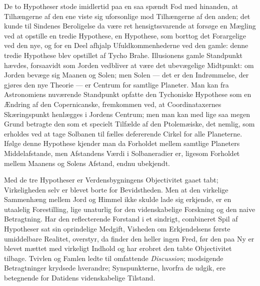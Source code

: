 \documentclass[12pt,a4paper]{book}
\begin{document}
De to Hypotheser stode imidlertid paa en saa spændt Fod med hinanden,
at Tilhængerne af den ene viste sig uforsonlige mod Tilhængerne af den
anden; det kunde til Sindenes Beroligelse da være ret hensigtssvarende
at forsøge en Mægling ved at opstille en tredie Hypothese, en
Hypothese, som borttog det Forargelige ved den nye, og for en Deel
afhjalp Ufuldkommenhederne ved den gamle: denne tredie Hypothese blev
opstillet af Tycho Brahe. Illusionens gamle Standpunkt hævdes,
forsaavidt som Jorden vedbliver at være det ubevægelige Midtpunkt: om
Jorden bevæge sig Maanen og Solen; men Solen --- det er den
Indrømmelse, der gjøres den nye Theorie --- er Centrum for samtlige
Planeter. Man kan fra Astronomiens nuværende Standpunkt opfatte den
Tychoniske Hypothese som en Ændring af den Copernicanske, fremkommen
ved, at Coordinataxernes Skæringspunkt henlægges i Jordens Centrum; men
man kan med lige saa megen Grund betragte den som et specielt Tilfælde
af den Ptolemæiske, det nemlig, som erholdes ved at tage Solbanen til
fælles defererende Cirkel for alle Planeterne. Ifølge denne Hypothese
kjender man da Forholdet mellem
samtlige Planeters Middelafstande, men Afstandens Værdi i
Solbaneradier er, ligesom Forholdet mellem Maanens og Solens Afstand,
endnu ubekjendt.

Med de tre Hypotheser er Verdensbygningens Objectivitet gaaet tabt;
Virkeligheden selv er blevet borte for Bevidstheden. Men at den
virkelige Sammenhæng mellem Jord og Himmel ikke skulde lade sig
erkjende, er en utaalelig Forestilling, lige unaturlig for den
videnskabelige Forskning og den naive Betragtning. Har den
reflecterende Forstand i et sindrigt, combineret Spil af Hypotheser sat
sin oprindelige Medgift, Visheden om Erkjendelsens første umiddelbare
Realitet, overstyr, da finder den heller ingen Fred, før den paa Ny er
blevet mættet med virkeligt Indhold og har erobret den tabte
Objectivitet tilbage. Tvivlen og Famlen ledte til omfattende
\emph{Discussion}; modsigende Betragtninger krydsede hverandre;
Synspunkterne, hvorfra de udgik, ere betegnende for Datidens
videnskabelige Tilstand.
\end{document}
